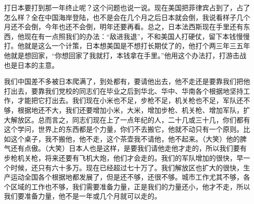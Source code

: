 打日本要打到那一年终止呢？这个问题也说一说。现在美国把菲律宾占到了，占了怎么样？全在中国海岸登陆，也不是会在几个月之后日本就会倒，我说看样子几个月还不会倒，今年也还不会倒，明年还要再看。总之，日本法西斯现在手里还有东西，他现在有一点照我们的办法：“敌进我退”，不和美国人打硬仗，留下本钱慢慢打。他就是这么一个计策，日本想美国是不想打长期仗了的，他打个两三年三五年他就是想回家，“你想回家了我就打，本钱拿在手里。”他用这个办法打，打游击战也是日本的主意。

我们中国差不多被日本爬满了，到处都有，要请他出去，他不走还是要靠我们把他打出去，要靠我们党校的同志们在毕业之后到华北、华中、华南各个根据地坚持工作，才能把它打出去。我们现在小米也不足，步枪不足，机关枪也不足，军队还不够，根据地还不大，我们还要增加小米，大米，增加步枪、机关枪、增加军队，扩大解放区。总而言之，同志们现在上了一点年纪的人，二十几或三十几，你们都有这个学问，世界上的东西都是个力量，你们不去搬它，他就不动只有一个原则。比如这个桌子，我不搬他，他不走，这个茶壶我不请他，他不起来。（大笑）他的脾气还有点傲。（大笑）日本人也是这样，是要我们请他走他才走的，所以我们要有步枪机关枪，将来还要有飞机大炮，他们才会走的。我们的军队增加的很快，早一个时候，还只有六十多万。现在已经超过七十万了。我们解放区也扩大的很快，生产运动全国各个根据地都发展了，但是还不够，还很不够。城市工作尤其不够，各个区域的工作也不够，我们需要准备力量，正是我们的力量还小，他才不走，所以我们要准备力量，他不是一年或几个月就可以走的。

